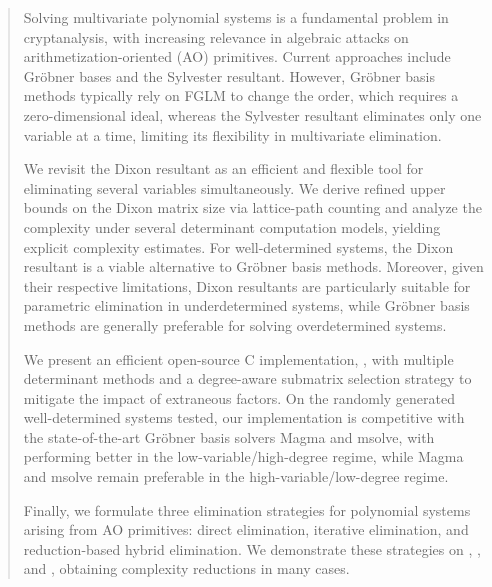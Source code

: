 \begin{abstract}
	Solving multivariate polynomial systems is a fundamental problem in cryptanalysis, with increasing relevance in algebraic attacks on arithmetization-oriented (AO) primitives. Current approaches include Gr\"obner bases and the Sylvester resultant. However, Gr\"obner basis methods typically rely on FGLM to change the order, which requires a zero-dimensional ideal, whereas the Sylvester resultant eliminates only one variable at a time, limiting its flexibility in multivariate elimination.
    
	We revisit the Dixon resultant as an efficient and flexible tool for eliminating several variables simultaneously. We derive refined upper bounds on the Dixon matrix size via lattice-path counting and analyze the complexity under several determinant computation models, yielding explicit complexity estimates. For well-determined systems, the Dixon resultant is a viable alternative to Gr\"obner basis methods. Moreover, given their respective limitations, Dixon resultants are particularly suitable for parametric elimination in underdetermined systems, while Gr\"obner basis methods are generally preferable for solving overdetermined systems.
    
	We present an efficient open-source C implementation, \drsolve, with multiple determinant methods and a degree-aware submatrix selection strategy to mitigate the impact of extraneous factors. On the randomly generated well-determined systems tested, our implementation is competitive with the state-of-the-art Gr\"obner basis solvers Magma and msolve, with \drsolve performing better in the low-variable/high-degree regime, while Magma and msolve remain preferable in the high-variable/low-degree regime.
	
	Finally, we formulate three elimination strategies for polynomial systems arising from AO primitives: direct elimination, iterative elimination, and reduction-based hybrid elimination. We demonstrate these strategies on \poseidon, \vision, and \xhash, obtaining complexity reductions in many cases.

\end{abstract}

